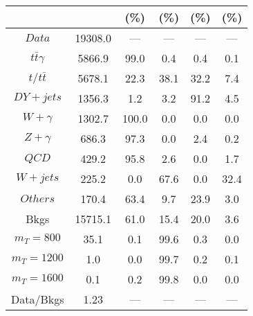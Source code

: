 \begin{figure}
\begin{minipage}[c]{0.32\textwidth}
{\begin{tabular}{cccccc}
 &  & (\%) & (\%) & (\%) & (\%)  \\
\hline
                                                                      $ Data $ &  19308.0 &  --- &  --- &  --- &  ---\\
$ t\bar{t}\gamma $ &  5866.9 &  99.0 &  0.4 &  0.4 &  0.1\\
$ t/t\bar{t} $ &  5678.1 &  22.3 &  38.1 &  32.2 &  7.4\\
$ DY+jets $ &  1356.3 &  1.2 &  3.2 &  91.2 &  4.5\\
$ W+\gamma $ &  1302.7 &  100.0 &  0.0 &  0.0 &  0.0\\
$ Z+\gamma $ &  686.3 &  97.3 &  0.0 &  2.4 &  0.2\\
$ QCD $ &  429.2 &  95.8 &  2.6 &  0.0 &  1.7\\
$ W+jets $ &  225.2 &  0.0 &  67.6 &  0.0 &  32.4\\
$ Others $ &  170.4 &  63.4 &  9.7 &  23.9 &  3.0\\
Bkgs &  15715.1 &  61.0 &  15.4 &  20.0 &  3.6\\
$ m_{T} = 800 $ &  35.1 &  0.1 &  99.6 &  0.3 &  0.0\\
$ m_{T} = 1200 $ &  1.0 &  0.0 &  99.7 &  0.2 &  0.1\\
$ m_{T} = 1600 $ &  0.1 &  0.2 &  99.8 &  0.0 &  0.0\\
Data/Bkgs &  1.23 &  --- &  --- &  --- &  ---\\
\hline
\end{tabular}
}
\end{minipage}
\end{figure}

